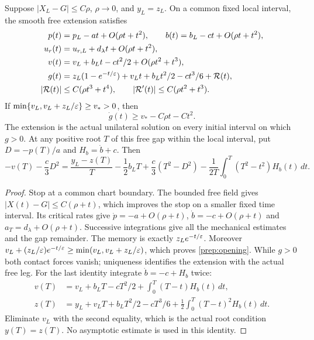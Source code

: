 \begin{lemma}
\label{lem:detuned-free-gap-expansion}
Suppose $|X_L-G|\le C\rho$, $\rho\to0$, and $y_L=z_L$.
On a common fixed local interval, the smooth free extension satisfies
\begin{align}
 p(t)&=p_L-at+O(\rho t+t^2),\qquad
 b(t)=b_L-ct+O(\rho t+t^2),\nonumber\\
 u_r(t)&=u_{r,L}+d_\lambda t+O(\rho t+t^2),\nonumber\\
 v(t)&=v_L+b_Lt-ct^2/2+O(\rho t^2+t^3),
 \label{prep:free-expansions}\\
 g(t)&=z_L(1-e^{-t/\varepsilon})+v_Lt+b_Lt^2/2-ct^3/6+\mathcal R(t),
 \nonumber\\
 |\mathcal R(t)|&\le C(\rho t^3+t^4),\qquad
 |\mathcal R'(t)|\le C(\rho t^2+t^3).
 \label{prep:gap-expansion}
\end{align}
If $\min\{v_L,v_L+z_L/\varepsilon\}\ge v_*>0$, then
\begin{equation}
 \dot g(t)\ge v_*-C\rho t-Ct^2.
 \label{prep:opening}
\end{equation}
The extension is the actual unilateral solution on every initial
interval on which $g>0$.
At any positive root $T$ of this free gap within the local interval,
put $D=-p(T)/a$ and $H_b=\dot b+c$. Then
\begin{equation}
 -v(T)-\frac c3D^2=\frac{y_L-z(T)}T-\frac12b_LT+
 \frac c3(T^2-D^2)-\frac1{2T}\int_0^T(T^2-t^2)H_b(t)\,dt.
 \label{prep:touchdown-cancellation}
\end{equation}
\end{lemma}
\begin{proof}
Stop at a common chart boundary. The bounded free field gives
$|X(t)-G|\le C(\rho+t)$, which improves the stop on a smaller
fixed time interval. Its critical rates give
$\dot p=-a+O(\rho+t)$, $\dot b=-c+O(\rho+t)$ and
$a_T=d_\lambda+O(\rho+t)$. Successive integrations give all the
mechanical estimates and the gap remainder. The memory is exactly
$z_Le^{-t/\varepsilon}$. Moreover
$v_L+(z_L/\varepsilon)e^{-t/\varepsilon}\ge\min(v_L,v_L+z_L/\varepsilon)$,
which proves \eqref{prep:opening}. While $g>0$ both contact forces
vanish; uniqueness identifies the extension with the actual free leg.
For the last identity integrate $\dot b=-c+H_b$ twice:
\[
 \begin{aligned}
 v(T)&=v_L+b_LT-cT^2/2+\int_0^T(T-t)H_b(t)\,dt,\\
 z(T)&=y_L+v_LT+b_LT^2/2-cT^3/6
                  +\tfrac12\int_0^T(T-t)^2H_b(t)\,dt.
 \end{aligned}
\]
Eliminate $v_L$ with the second equality, which is the actual root
condition $y(T)=z(T)$. No asymptotic estimate is used in this identity.
\end{proof}

